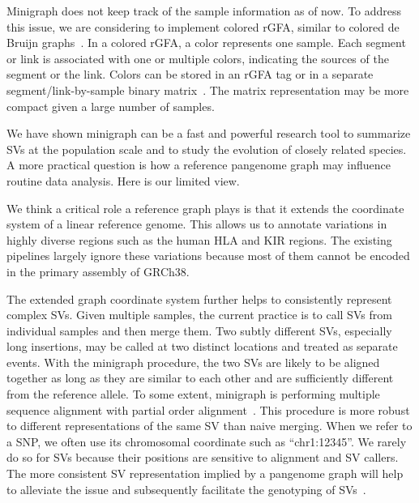 \documentclass[twocolumn]{bmcart}
\begin{document}
Minigraph does not keep track of the sample information as of now. To address
this issue, we are considering to implement colored rGFA, similar to colored de
Bruijn graphs~\cite{Iqbal:2012aa}. In a colored rGFA, a color represents one
sample.  Each segment or link is associated with one or multiple colors,
indicating the sources of the segment or the link. Colors can be stored in an
rGFA tag or in a separate segment/link-by-sample binary
matrix~\cite{Holley695338}. The matrix representation may be more compact given
a large number of samples.

We have shown minigraph can be a fast and powerful research tool to summarize
SVs at the population scale and to study the evolution of closely related
species. A more practical question is how a reference pangenome graph may
influence routine data analysis. Here is our limited view.

We think a critical role a reference graph plays is that it extends the
coordinate system of a linear reference genome. This allows us to annotate
variations in highly diverse regions such as the human HLA and KIR regions. The
existing pipelines largely ignore these variations because most of them cannot
be encoded in the primary assembly of GRCh38.

The extended graph coordinate system further helps to consistently represent
complex SVs. Given multiple samples, the current practice is to call SVs from
individual samples and then merge them. Two subtly different SVs, especially
long insertions, may be called at two distinct locations and treated as
separate events. With the minigraph procedure, the two SVs are likely to
be aligned together as long as they are similar to each other and are
sufficiently different from the reference allele. To some extent, minigraph is
performing multiple sequence alignment with partial order
alignment~\cite{Lee_2002}. This procedure is more robust to different
representations of the same SV than naive merging. When we refer to a SNP, we often use its
chromosomal coordinate such as ``chr1:12345''. We rarely do so for SVs because
their positions are sensitive to alignment and SV callers. The more consistent
SV representation implied by a pangenome graph will help to alleviate the issue
and subsequently facilitate the genotyping of
SVs~\cite{Hickey_2020,Eggertsson_2019,Chen_2019}.
\end{document}
